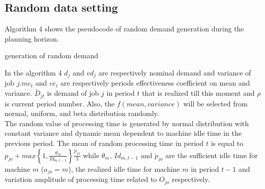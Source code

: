 \documentclass[letterpaper]{article} %
\begin{document}
\subsection{Random data setting}
Algorithm 4 shows the pseudocode of random demand generation during the planning horizon. 
\begin{algorithm}[t]
\SetAlgoVlined
{}
\caption{generation of random demand}
\end{algorithm}
In the algorithm 4 $d_{j}$ and $vd_{j}$ are respectively nominal demand and variance of job $j$.$mc_{t}$ and $vc_{t}$ are respectively periods effectiveness coefficient on mean and variance. $\tilde{D}_{jt}$ is demand of job $j$ in period $t$ that is realized till this moment and $\rho$ is current period number. Also, the $f(mean,variance)$ will be selected from normal, uniform, and beta distribution randomly.\\
The random value of processing time is generated by normal distribution with constant variance and dynamic mean dependent to machine idle time in the previous period. The mean of random processing time in period $t$ is equal to $p_{jo}+max\left\{1,\frac{\theta_{m}}{Id_{m,t-1}}\right\}\frac{\check{p}_{jo}}{3}$ while $\theta_{m}$, $Id_{m,t-1}$ and $\check{p}_{jo}$ are the sufficient idle time for machine $m$ ($a_{jo}=m$), the realized idle time for machine $m$ in period $t-1$ and variation amplitude of processing time related to $O_{jo}$ respectively.
\end{document}
